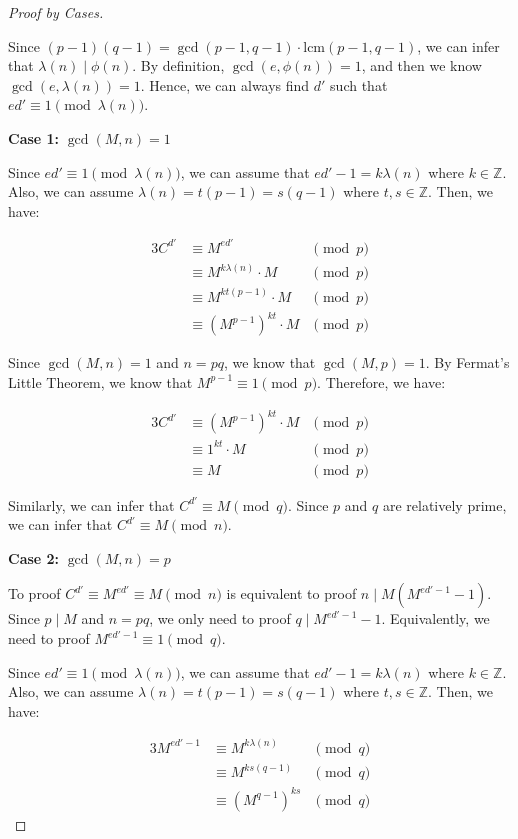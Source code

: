 \documentclass[a4paper,12pt]{article}
\begin{document}
\begin{proof}[Proof by Cases]
$ $

Since $(p-1)(q-1) = \gcd(p-1,q-1) \cdot \text{lcm}(p-1,q-1)$, we can infer that $\lambda(n) \mid \phi(n)$.
By definition, $\gcd(e,\phi(n)) = 1$, and then we know $\gcd(e,\lambda(n)) = 1$.
Hence, we can always find $d'$ such that $ed' \equiv 1 \pmod{\lambda(n)}$.

\textbf{Case 1:} $\gcd(M,n) = 1$

Since $ed' \equiv 1 \pmod{\lambda(n)}$, we can assume that $ed' - 1 = k \lambda(n)$ where $k \in \mathbb{Z}$.
Also, we can assume $\lambda(n) = t (p - 1) = s (q - 1)$ where $t,s \in \mathbb{Z}$.
Then, we have: 

\begin{alignat*}{3}
	C^{d'} &\equiv M^{ed'} &\pmod{p} \\
	&\equiv M^{k \lambda(n)} \cdot M &\pmod{p} \\
	&\equiv M^{k t (p - 1)} \cdot M &\pmod{p} \\
	&\equiv (M^{p-1})^{k t} \cdot M &\pmod{p}
\end{alignat*}

Since $\gcd(M,n) = 1$ and $n = pq$, we know that $\gcd(M,p) = 1$.
By Fermat's Little Theorem, we know that $M^{p-1} \equiv 1 \pmod{p}$.
Therefore, we have:

\begin{alignat*}{3}
	C^{d'} &\equiv (M^{p-1})^{k t} \cdot M &\pmod{p}\\
	&\equiv 1^{k t} \cdot M &\pmod{p}\\
	&\equiv M &\pmod{p}
\end{alignat*}

Similarly, we can infer that $C^{d'} \equiv M \pmod{q}$.
Since $p$ and $q$ are relatively prime, we can infer that $C^{d'} \equiv M \pmod{n}$.

\textbf{Case 2:} $\gcd(M,n) = p$

To proof $C^{d'} \equiv M^{ed'} \equiv M \pmod{n}$ is equivalent to proof $n \mid M (M^{ed' - 1} - 1)$. 
Since $p \mid M$ and $n = pq$, we only need to proof $q \mid M^{ed' - 1} - 1$.
Equivalently, we need to proof $M^{ed' - 1} \equiv 1 \pmod{q}$.

Since $ed' \equiv 1 \pmod{\lambda(n)}$, we can assume that $ed' - 1 = k \lambda(n)$ where $k \in \mathbb{Z}$.
Also, we can assume $\lambda(n) = t (p - 1) = s (q - 1)$ where $t,s \in \mathbb{Z}$.
Then, we have: 

\begin{alignat*}{3}
	M^{ed' - 1} &\equiv M^{k \lambda(n)} &\pmod{q} \\
	&\equiv M^{k s (q - 1)} &\pmod{q} \\
	&\equiv (M^{q-1})^{k s} &\pmod{q}
\end{alignat*}


\end{proof}
\end{document}
